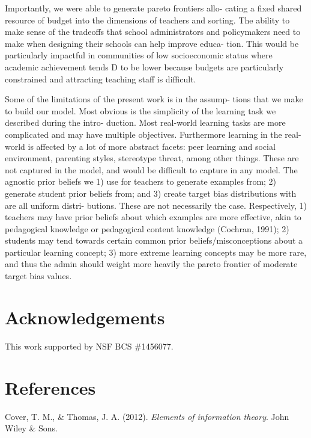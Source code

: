 \documentclass[10pt, letterpaper]{article}
\begin{document}
Importantly, we were able to generate pareto frontiers allo- cating a
fixed shared resource of budget into the dimensions of teachers and
sorting. The ability to make sense of the tradeoffs that school
administrators and policymakers need to make when designing their
schools can help improve educa- tion. This would be particularly
impactful in communities of low socioeconomic status where academic
achievement tends D to be lower because budgets are particularly
constrained and attracting teaching staff is difficult.

Some of the limitations of the present work is in the assump- tions that
we make to build our model. Most obvious is the simplicity of the
learning task we described during the intro- duction. Most real-world
learning tasks are more complicated and may have multiple objectives.
Furthermore learning in the real-world is affected by a lot of more
abstract facets: peer learning and social environment, parenting styles,
stereotype threat, among other things. These are not captured in the
model, and would be difficult to capture in any model. The agnostic
prior beliefs we 1) use for teachers to generate examples from; 2)
generate student prior beliefs from; and 3) create target bias
distributions with are all uniform distri- butions. These are not
necessarily the case. Respectively, 1) teachers may have prior beliefs
about which examples are more effective, akin to pedagogical knowledge
or pedagogical content knowledge (Cochran, 1991); 2) students may tend
towards certain common prior beliefs/misconceptions about a particular
learning concept; 3) more extreme learning concepts may be more rare,
and thus the admin should weight more heavily the pareto frontier of
moderate target bias values.

\section{Acknowledgements}\label{acknowledgements}

This work supported by NSF BCS \#1456077.

\section{References}\label{references}

\setlength{\parindent}{-0.1in} \setlength{\leftskip}{0.125in} \noindent

\hypertarget{refs}{}
\hypertarget{ref-cover2012}{}
Cover, T. M., \& Thomas, J. A. (2012). \emph{Elements of information
theory}. John Wiley \& Sons.
\end{document}
